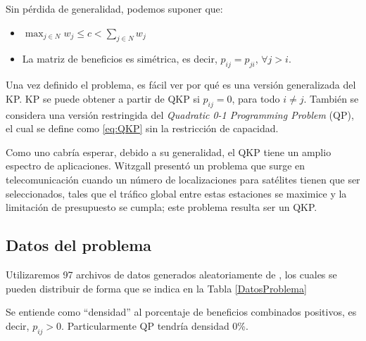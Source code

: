 Sin pérdida de generalidad, podemos suponer que:
\begin{itemize}
	\item $\max_{j\in N} w_j \leq c < \sum_{j\in N}w_j$
	\item La matriz de beneficios es simétrica, es decir, $p_{ij} = p_{ji}$, $\forall j > i$.
\end{itemize}

Una vez definido el problema, es fácil ver por qué es una versión generalizada del KP. 
KP se puede obtener a partir de QKP si $p_{ij} = 0$, para todo $i\neq j$. 
También se considera una versión restringida del \textit{Quadratic 0-1 Programming Problem} (QP), el cual se define como \ref{eq:QKP} sin la restricción de capacidad.

Como uno cabría esperar, debido a su generalidad, el QKP tiene un amplio espectro de aplicaciones. 
Witzgall \parencite{witzgallMathematicalMethodsSite1975} presentó un problema que surge en telecomunicación cuando un número de localizaciones para satélites tienen que ser seleccionados, tales que el tráfico global entre estas estaciones se maximice y la limitación de presupuesto se cumpla; este problema resulta ser un QKP. 


\subsection{Datos del problema}

Utilizaremos 97 archivos de datos generados aleatoriamente de %
, los cuales se pueden distribuir de forma que se indica en la Tabla \ref{DatosProblema}



Se entiende como ``densidad'' al porcentaje de beneficios combinados positivos, es decir, $p_{ij} > 0$. 
Particularmente QP tendría densidad 0\%.

